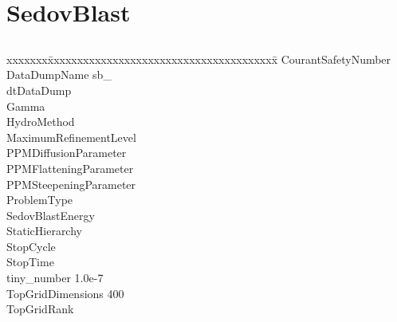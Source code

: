 \documentclass{book}
\begin{document}
\subsection{\cello}

\section{SedovBlast} \label{s:SedovBlast}

\subsection{\enzo}

{\parametersize
\begin{tabbing}
xxxxxxx\=xxxxxxxxxxxxxxxxxxxxxxxxxxxxxxxxxxxxxxx\=\kill
\> CourantSafetyNumber             \\
\> DataDumpName              \> sb\_ \\
\> dtDataDump                 \\
\> Gamma                      \\
\> HydroMethod                       \\
\> MaximumRefinementLevel            \\
\> PPMDiffusionParameter      \\
\> PPMFlatteningParameter     \\
\> PPMSteepeningParameter     \\
\> ProblemType                       \\
\> SedovBlastEnergy           \\
\> StaticHierarchy                   \\
\> StopCycle                  \\
\> StopTime                   \\
\> tiny\_number               \> 1.0e-7 \\
\> TopGridDimensions          400 \\
\> TopGridRank               
\end{tabbing}}
\end{document}
